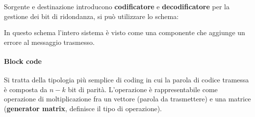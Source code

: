 Sorgente e destinazione introducono \textbf{codificatore} e \textbf{decodificatore} per la gestione dei bit di ridondanza, si può utilizzare lo schema:


\begin{center}
\end{center}


\begin{center}

\end{center}

In questo schema l'intero sistema è visto come una componente che aggiunge un errore al messaggio trasmesso.

\paragraph*{Block code}
Si tratta della tipologia più semplice di coding in cui la parola  di codice tramessa è composta da $n-k$ bit di parità.
L'operazione è rappresentabile come operazione di moltiplicazione fra un vettore (parola da trasmettere) e una matrice (\textbf{generator matrix}, definisce il tipo di operazione).

